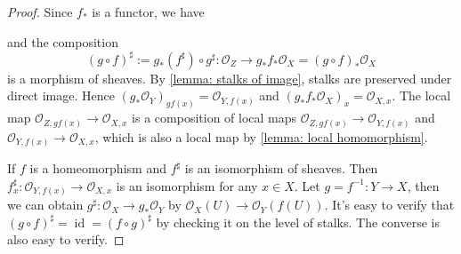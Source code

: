 \documentclass[11pt]{article}
\newcommand{\id}{\operatorname{id}}
\begin{document}
\begin{proof}
    Since $ f_{*} $ is a functor, we have 
    \begin{center}
    \end{center}
    and the composition 
    $$(g \circ f)^{\sharp}:=g_{*}(f^{\sharp}) \circ g^{\sharp}: \mathscr{O}_{Z} \to g_*f_*\mathscr{O}_X = (g \circ f)_{*}\mathscr{O}_{X} $$ 
    is a morphism of sheaves. 
    By \autoref{lemma: stalks of image}, 
    stalks are preserved under direct image. 
    Hence $( g_{*}\mathscr{O}_{Y} )_{gf(x)}=\mathscr{O}_{Y,f(x)}$ 
    and $ (g_{*}f_{*}\mathscr{O}_{X})_{x} = \mathscr{O}_{X,x} $. 
    The local map $ \mathscr{O}_{Z,gf(x)} \to \mathscr{O}_{X,x} $ 
    is a composition of local maps $ \mathscr{O}_{Z,gf(x)} \to \mathscr{O}_{Y,f(x)} $ 
    and $ \mathscr{O}_{Y,f(x)} \to \mathscr{O}_{X,x} $, 
    which is also a local map by \autoref{lemma: local homomorphism}. 

    If $ f $ is a homeomorphism and $ f^{\sharp} $ is an isomorphism of sheaves. 
    Then $ f^{\sharp}_{x}: \mathscr{O}_{Y,f(x)} \to \mathscr{O}_{X,x} $ 
    is an isomorphism for any $ x \in X $. 
    Let $ g=f^{-1}: Y \to X $, then we can obtain $ g^{\sharp}:\mathscr{O}_{X} \to g_{*}\mathscr{O}_{Y} $ 
    by $ \mathscr{O}_{X}(U) \to \mathscr{O}_{Y}(f(U)) $. 
    It's easy to verify that $ (g \circ f)^{\sharp}=\id = (f \circ g)^{\sharp} $ 
    by checking it on the level of stalks. The converse is also easy to verify. 
\end{proof}
\end{document}
